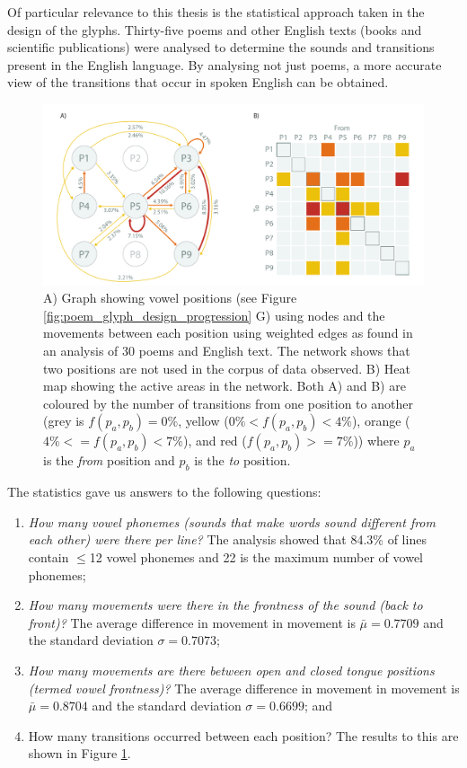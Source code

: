 Of particular relevance to this thesis is the statistical approach taken in the design of the glyphs.
Thirty-five poems and other English texts (books and scientific publications) were analysed to determine the sounds and transitions present in the English language.
By analysing not just poems, a more accurate view of the transitions that occur in spoken English can be obtained.

\begin{figure}[t!]
\centering
\includegraphics[width=\textwidth]{images/other_glyphs/macro_stats}
\caption{A) Graph showing vowel positions (see Figure \ref{fig:poem_glyph_design_progression} G) using nodes and the movements between each position using weighted edges as found in an analysis of 30 poems and English text.
The network shows that two positions are not used in the corpus of data observed.
B) Heat map showing the active areas in the network. 
Both A) and B) are coloured by the number of transitions from one position to another (grey is $f(p_a, p_b) = 0\%$, yellow ($0\%<f(p_a, p_b)< 4\%$), orange ($4\%<=f(p_a, p_b)<7\%$), and red ($f(p_a, p_b)>=7\%$)) where $p_a$ is the \emph{from} position and $p_b$ is the \emph{to} position.}
\label{fig:poem_statistics}
\end{figure}

The statistics gave us answers to the following questions: 
\begin{enumerate}
\item \emph{How many vowel phonemes (sounds that make words sound different from each other) were there per line?} The analysis showed that 84.3\% of lines contain $\leq$12 vowel phonemes and 22 is the maximum number of vowel phonemes;
\item \emph{How many movements were there in the frontness of the sound (back to front)?} The average difference in movement in movement is $\bar\mu=0.7709$ and the standard deviation $\sigma=0.7073$;
\item \emph{How many movements are there between open and closed tongue positions (termed vowel frontness)?} The average difference in movement in movement is $\bar\mu=0.8704$ and the standard deviation $\sigma=0.6699$; and 
\item How many transitions occurred between each position? The results to this are shown in Figure \ref{fig:poem_statistics}.
\end{enumerate}

